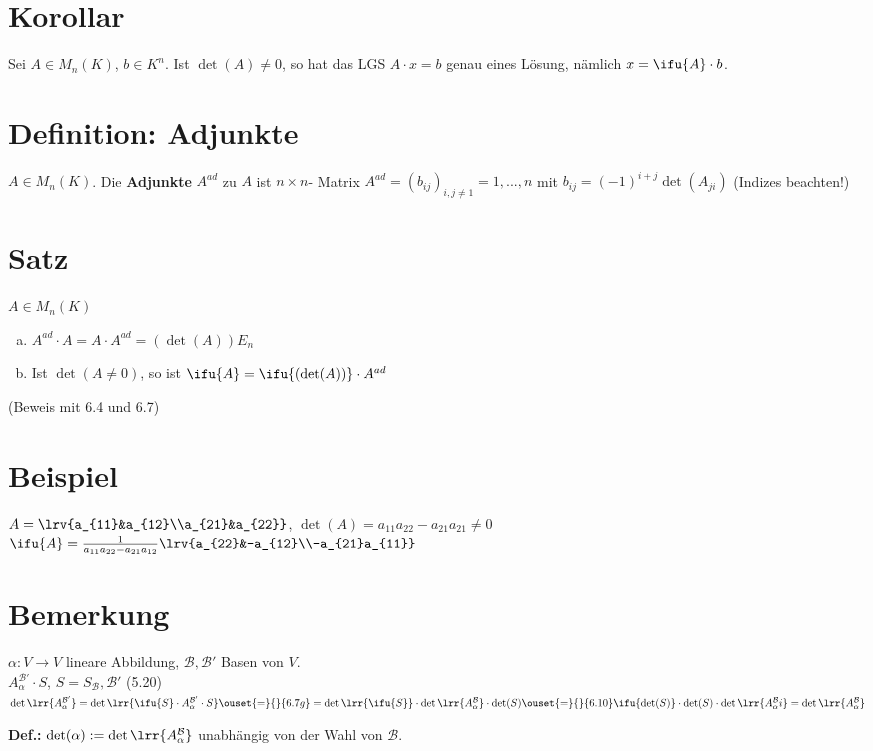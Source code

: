 \section{Korollar}
Sei $A\in M_n(K)$, $b\in K^n$. Ist $\det(A)\neq 0$, so hat das LGS $A\cdot x=b$
genau eines Lösung, nämlich $x=\ifu{A}\cdot b$.

\section{Definition: Adjunkte}
$A\in M_n(K)$. Die \textbf{Adjunkte} $A^{ad}$ zu $A$ ist $n\times n$- Matrix
$A^{ad}=(b_{ij})_{i,j\neq 1}=1,...,n$ mit $b_{ij}=(-1)^{i+j}\det(A_{ji})$
(Indizes beachten!)

\section{Satz}
$A\in M_n(K)$
\begin{enumerate}[a)]
  \item $A^{ad}\cdot A=A\cdot A^{ad}=(\det(A))E_n$
  \item Ist $\det(A\neq 0)$, so ist $\ifu{A}=\ifu{(\det(A))}\cdot A^{ad}$
\end{enumerate}
(Beweis mit 6.4 und 6.7)

\section{Beispiel}
$A=\lrv{a_{11}&a_{12}\\a_{21}&a_{22}}$, $\det(A)=a_{11}a_{22}-a_{21}a_{21}\neq 0$\\
$\ifu{A}=\frac{1}{a_{11}a_{22}-a_{21}a_{12}}\lrv{a_{22}&-a_{12}\\-a_{21}a_{11}}$

\section{Bemerkung}
$\alpha:V\rightarrow V$ lineare Abbildung, $\mathcal{B},\mathcal{B}'$ Basen von $V$.\\
$A_\alpha^{\mathcal{B}'}\cdot S$, $S=S_{\mathcal{B}},\mathcal{B}'$ (5.20)\\
$\det\lrr{A_\alpha^{\mathcal{B}'}}=\det\lrr{\ifu{S}\cdot A_\alpha^{\mathcal{B}'}\cdot
S}\ouset{=}{}{6.7g}=\det\lrr{\ifu{S}}\cdot\det\lrr{A_\alpha^{\mathcal{B}}}\cdot\det(S)\ouset{=}{}{6.10}\ifu{\det(S)}\cdot\det(S)\cdot\det\lrr{A_\alpha^{\mathcal{B}}i}=\det\lrr{A_\alpha^{\mathcal{B}}}$

\textbf{Def.:} $\det(\alpha):=\det\lrr{A_\alpha^{\mathcal{B}}}$ unabhängig von
der Wahl von $\mathcal{B}$.
